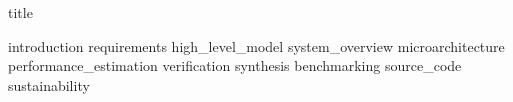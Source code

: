 \documentclass{article}
\begin{document}
{title}

\frontmatter
\tableofcontents
\listoffigures
\listoftables

\mainmatter

{introduction}            %
{requirements}            %
{high_level_model}        %
{system_overview}
{microarchitecture}       %
{performance_estimation}  %
{verification}            %
{synthesis}               %
{benchmarking}            %
{source_code}             %
{sustainability}          %

\newpage
\nocite{*}
\printbibliography[heading = bibintoc, title = References]

\end{document}
